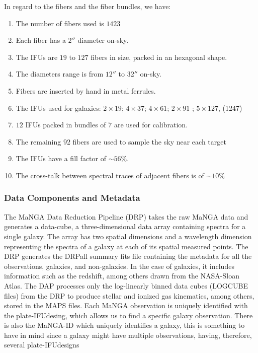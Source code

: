 In regard to the fibers and the fiber bundles, we have:

\begin{enumerate}
  \item The number of fibers used is $1423$
  
  \item Each fiber has a $2''$ diameter on-sky.
  
  \item The IFUs are $19$ to $127$ fibers in size, packed in an hexagonal shape. 
  
  \item The diameters range is from $12''$ to $32''$ on-sky. 
  
  \item Fibers are inserted by hand in metal ferrules. 
  
  \item The IFUs used for galaxies: $2 \times 19$; $4 \times 37$; $4 \times 61$; $2 \times 91$ ; $5 \times 127$, (1247)
  
  \item $12$ IFUs packed in bundles of $7$ are used for calibration. 
  
  \item The remaining $92$ fibers are used to sample the sky near each target
  
  \item The IFUs have a fill factor of $ \sim 56 \%$. 
  
  \item The cross-talk between spectral traces of adjacent fibers is of $ \sim 10 \%$
\end{enumerate}

\subsubsection{Data Components and Metadata}

The MaNGA Data Reduction Pipeline (DRP) \citep{law2016} takes the raw MaNGA data and generates a data-cube, a three-dimensional data array containing spectra for a single galaxy. The array has two spatial dimensions and a wavelength dimension representing the spectra of a galaxy at each of its spatial measured points. The DRP generates the DRPall summary fits file containing the metadata for all the observations, galaxies, and non-galaxies. In the case of galaxies, it includes information such as the redshift, among others drawn from the NASA-Sloan Atlas. The DAP processes only the log-linearly binned data cubes (LOGCUBE files) from the DRP to produce stellar and ionized gas kinematics, among others, stored in the MAPS files. Each MaNGA observation is uniquely identified with the plate-IFUdesing, which allows us to find a specific galaxy observation. There is also the MaNGA-ID which uniquely identifies a galaxy, this is something to have in mind since a galaxy might have multiple observations, having, therefore, several plate-IFUdesigns

